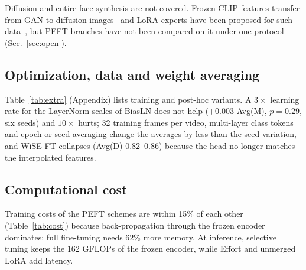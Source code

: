 \documentclass[fonts]{icst}
\begin{document}
Diffusion and entire-face synthesis are not covered. Frozen CLIP features transfer from GAN to diffusion images~\cite{ojha2023universal} and LoRA experts have been proposed for such data~\cite{liu2024mole}, but PEFT branches have not been compared on it under one protocol (Sec.~\ref{sec:open}).

\subsection{Optimization, data and weight averaging}
\label{sec:extra}
Table~\ref{tab:extra} (Appendix) lists training and post-hoc variants. A $3\times$ learning rate for the LayerNorm scales of BiasLN does not help ($+0.003$ Avg(M), $p=0.29$, six seeds) and $10\times$ hurts; 32 training frames per video, multi-layer class tokens and epoch or seed averaging change the averages by less than the seed variation, and WiSE-FT collapses (Avg(D) 0.82--0.86) because the head no longer matches the interpolated features.



\subsection{Computational cost}
\label{sec:cost}
Training costs of the PEFT schemes are within 15\% of each other (Table~\ref{tab:cost}) because back-propagation through the frozen encoder dominates; full fine-tuning needs 62\% more memory. At inference, selective tuning keeps the 162 GFLOPs of the frozen encoder, while Effort and unmerged LoRA add latency.

\begin{table}[!t]
\centering
\caption{Measured cost on an NVIDIA A100-40GB (fp32, $224\times224$). Train: batch 32, forward + backward + Adam step. Infer: batch 1. Ckpt: size of the stored trainable tensors.}
\label{tab:cost}
\end{table}
\end{document}
